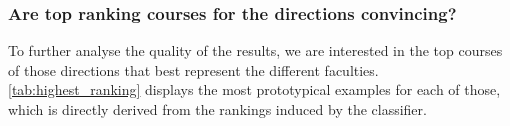 






\subsubsection*{Are top ranking courses for the directions convincing?}

To further analyse the quality of the results, we are interested in the top courses of those directions that best represent the different faculties. \autoref{tab:highest_ranking} displays the most prototypical examples for each of those, which is directly derived from the rankings induced by the classifier.

